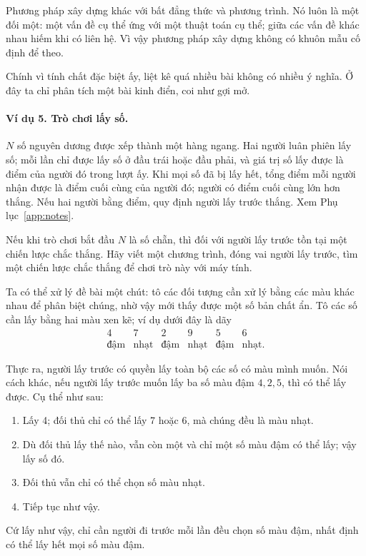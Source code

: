 \documentclass[11pt]{article}
\begin{document}
Phương pháp xây dựng khác với bất đẳng thức và phương trình. Nó luôn là một
đối một: một vấn đề cụ thể ứng với một thuật toán cụ thể; giữa các vấn đề
khác nhau hiếm khi có liên hệ. Vì vậy phương pháp xây dựng không có khuôn mẫu
cố định để theo.

Chính vì tính chất đặc biệt ấy, liệt kê quá nhiều bài không có nhiều ý nghĩa.
Ở đây ta chỉ phân tích một bài kinh điển, coi như gợi mở.

\paragraph{Ví dụ 5. Trò chơi lấy số.}
\(N\) số nguyên dương được xếp thành một hàng ngang. Hai người luân phiên lấy
số; mỗi lần chỉ được lấy số ở đầu trái hoặc đầu phải, và giá trị số lấy được
là điểm của người đó trong lượt ấy. Khi mọi số đã bị lấy hết, tổng điểm mỗi
người nhận được là điểm cuối cùng của người đó; người có điểm cuối cùng lớn
hơn thắng. Nếu hai người bằng điểm, quy định người lấy trước thắng. Xem
Phụ lục~\ref{app:notes}.

Nếu khi trò chơi bắt đầu \(N\) là số chẵn, thì đối với người lấy trước tồn
tại một chiến lược chắc thắng. Hãy viết một chương trình, đóng vai người lấy
trước, tìm một chiến lược chắc thắng để chơi trò này với máy tính.

Ta có thể xử lý đề bài một chút: tô các đối tượng cần xử lý bằng các màu khác
nhau để phân biệt chúng, nhờ vậy mới thấy được một số bản chất ẩn. Tô các số
cần lấy bằng hai màu xen kẽ; ví dụ dưới đây là dãy
\[
\begin{array}{cccccc}
4&7&2&9&5&6\\
\text{đậm}&\text{nhạt}&\text{đậm}&\text{nhạt}&\text{đậm}&\text{nhạt}.
\end{array}
\]

Thực ra, người lấy trước có quyền lấy toàn bộ các số có màu mình muốn. Nói
cách khác, nếu người lấy trước muốn lấy ba số màu đậm \(4,2,5\), thì có thể
lấy được. Cụ thể như sau:
\begin{enumerate}
  \item Lấy 4; đối thủ chỉ có thể lấy 7 hoặc 6, mà chúng đều là màu nhạt.
  \item Dù đối thủ lấy thế nào, vẫn còn một và chỉ một số màu đậm có thể lấy;
  vậy lấy số đó.
  \item Đối thủ vẫn chỉ có thể chọn số màu nhạt.
  \item Tiếp tục như vậy.
\end{enumerate}

Cứ lấy như vậy, chỉ cần người đi trước mỗi lần đều chọn số màu đậm, nhất định
có thể lấy hết mọi số màu đậm.
\end{document}
